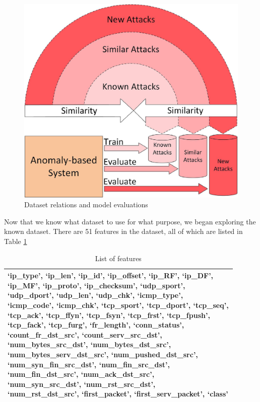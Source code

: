 \begin{figure}[!htb]
    \centering
    \includegraphics{figures/uploads/known_similar_new_attacks.jpg}
    \caption{Dataset relations and model evaluations}
    \label{figure-known-similar-new}
\end{figure}

Now that we know what dataset to use for what purpose, we began exploring the known dataset. There are 51 features in the dataset, all of which are listed in Table \ref{table-featurelist}


\begin{table}[!htb]
    \centering
    \caption{List of features}
    \label{table-featurelist}
    \begin{tabular}{>{\centering\arraybackslash}p{0.9\linewidth}}
    \toprule
 `ip\_type', `ip\_len', `ip\_id', `ip\_offset', `ip\_RF', `ip\_DF', `ip\_MF', `ip\_proto', `ip\_checksum', `udp\_sport', `udp\_dport', `udp\_len', `udp\_chk', `icmp\_type', `icmp\_code', `icmp\_chk', `tcp\_sport', `tcp\_dport', `tcp\_seq', `tcp\_ack', `tcp\_ffyn', `tcp\_fsyn', `tcp\_frst', `tcp\_fpush', `tcp\_fack', `tcp\_furg', `fr\_length', `conn\_status', `count\_fr\_dst\_src', `count\_serv\_src\_dst', `num\_bytes\_src\_dst', `num\_bytes\_dst\_src', `num\_bytes\_serv\_dst\_src', `num\_pushed\_dst\_src', `num\_syn\_fin\_src\_dst', `num\_fin\_src\_dst', `num\_fin\_dst\_src', `num\_ack\_dst\_src', `num\_syn\_src\_dst', `num\_rst\_src\_dst', `num\_rst\_dst\_src', `first\_packet', `first\_serv\_packet', `class'\\
 \bottomrule
    \end{tabular}
\end{table}


